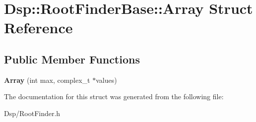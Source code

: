 \hypertarget{structDsp_1_1RootFinderBase_1_1Array}{\section{Dsp\-:\-:Root\-Finder\-Base\-:\-:Array Struct Reference}
\label{structDsp_1_1RootFinderBase_1_1Array}
}
\subsection*{Public Member Functions}
\begin{DoxyCompactItemize}
\item 
\hypertarget{structDsp_1_1RootFinderBase_1_1Array_a85b0dd087292b1bfd4ff345a8fbe713d}{{\bfseries Array} (int max, complex\-\_\-t $\ast$values)}\label{structDsp_1_1RootFinderBase_1_1Array_a85b0dd087292b1bfd4ff345a8fbe713d}

\end{DoxyCompactItemize}


The documentation for this struct was generated from the following file\-:\begin{DoxyCompactItemize}
\item 
Dsp/Root\-Finder.\-h\end{DoxyCompactItemize}
